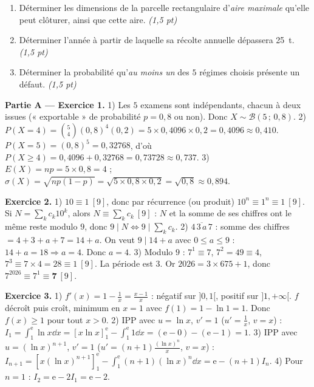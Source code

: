 \begin{enumerate}[label=\textbf{Tâche \arabic*.},leftmargin=2.4em]
\item Déterminer les dimensions de la parcelle rectangulaire d'\emph{aire maximale}
qu'elle peut clôturer, ainsi que cette aire. \hfill\textit{(1,5 pt)}
\item Déterminer l'année à partir de laquelle sa récolte annuelle dépassera \SI{25}{\tonne}. \hfill\textit{(1,5 pt)}
\item Déterminer la probabilité qu'\emph{au moins un} des $5$ régimes choisis présente un défaut. \hfill\textit{(1,5 pt)}
\end{enumerate}
\par{}


\noindent\textbf{Partie A — Exercice 1.}
1) Les $5$ examens sont indépendants, chacun à deux issues (« exportable » de
probabilité $p=0{,}8$ ou non). Donc $X\sim\mathcal{B}(5\,;\,0{,}8)$.
2) $P(X{=}4)=\binom54(0{,}8)^4(0{,}2)=5\times0{,}4096\times0{,}2=0{,}4096\approx0{,}410$.
$P(X{=}5)=(0{,}8)^5=0{,}32768$, d'où $P(X\ge4)=0{,}4096+0{,}32768=0{,}73728\approx0{,}737$.
3) $E(X)=np=5\times0{,}8=4$ ; $\sigma(X)=\sqrt{np(1-p)}=\sqrt{5\times0{,}8\times0{,}2}=\sqrt{0{,}8}\approx0{,}894$.

\noindent\textbf{Exercice 2.}
1) $10\equiv1\ [9]$, donc par récurrence (ou produit) $10^n\equiv1^n\equiv1\ [9]$. Si
$N=\sum_k c_k 10^k$, alors $N\equiv\sum_k c_k\ [9]$ : $N$ et la somme de ses chiffres ont
le même reste modulo $9$, donc $9\mid N\iff 9\mid\sum_k c_k$.
2) $\overline{4\,3\,a\,7}$ : somme des chiffres $=4+3+a+7=14+a$. On veut $9\mid14+a$ avec
$0\le a\le9$ : $14+a=18\Rightarrow a=4$. Donc $a=4$.
3) Modulo $9$ : $7^1\equiv7$, $7^2=49\equiv4$, $7^3\equiv7\times4=28\equiv1\ [9]$. La
période est $3$. Or $2026=3\times675+1$, donc $7^{2026}\equiv7^1\equiv\mathbf{7}\ [9]$.

\noindent\textbf{Exercice 3.}
1) $f'(x)=1-\frac1x=\frac{x-1}{x}$ : négatif sur $]0,1[$, positif sur $]1,+\infty[$. $f$
décroît puis croît, minimum en $x=1$ avec $f(1)=1-\ln1=1$. Donc $f(x)\ge1$ pour tout $x>0$.
2) IPP avec $u=\ln x$, $v'=1$ ($u'=\frac1x$, $v=x$) :
$I_1=\int_1^{\mathrm e}\ln x\dd x=[x\ln x]_1^{\mathrm e}-\int_1^{\mathrm e}1\dd x=(\mathrm e-0)-(\mathrm e-1)=1$.
3) IPP avec $u=(\ln x)^{n+1}$, $v'=1$ ($u'=(n+1)\frac{(\ln x)^n}{x}$, $v=x$) :
$I_{n+1}=[x(\ln x)^{n+1}]_1^{\mathrm e}-\int_1^{\mathrm e}(n+1)(\ln x)^n\dd x=\mathrm e-(n+1)I_n$.
4) Pour $n=1$ : $I_2=\mathrm e-2I_1=\mathrm e-2$.

